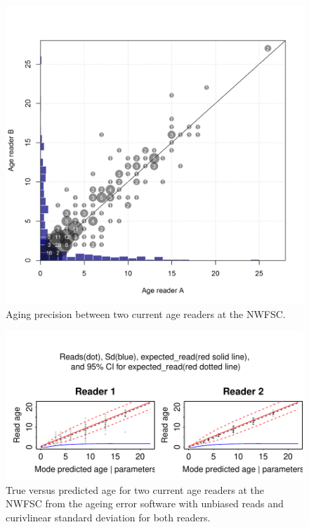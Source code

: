 \documentclass[12pt,]{article}
\begin{document}
\FloatBarrier

\FloatBarrier

\begin{figure}[htbp]
\centering
\includegraphics{Figures/Fleet8_NWFSCTrawl_ageerror.png}
\caption{Aging precision between two current age readers at the NWFSC.
\label{fig:Fleet8_NWFSCTrawl_ageerror}}
\end{figure}

\begin{figure}[htbp]
\centering
\includegraphics{Figures/Fleet8_NWFSCTrawl_ageerror2.pdf}
\caption{True versus predicted age for two current age readers at the
NWFSC from the ageing error software with unbiased reads and curivlinear
standard deviation for both readers.
\label{fig:Fleet8_NWFSCTrawl_ageerror2}}
\end{figure}
\end{document}
